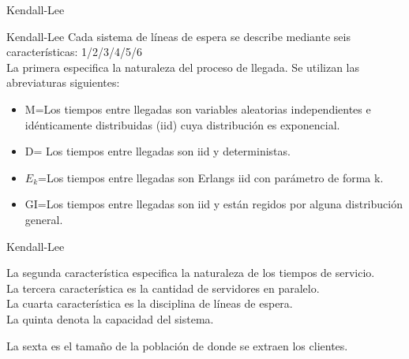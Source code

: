 \begin{frame}
	\centering \LARGE \color{naranjaUCA} Kendall-Lee
\end{frame}
\begin{frame}{Kendall-Lee}
Cada sistema de líneas de espera se describe mediante seis características:
1/2/3/4/5/6
\\
		La primera especifica la naturaleza del proceso de llegada. Se utilizan las abreviaturas siguientes:
		\pause
		\begin{itemize}
			\item M=Los tiempos entre llegadas son variables aleatorias independientes e idénticamente distribuidas (iid) cuya distribución es exponencial.
			\pause
			\item D= Los tiempos entre llegadas son iid y deterministas. \pause
			\item $E_k$=Los tiempos entre llegadas son Erlangs iid con parámetro de forma k.
			\pause
			\item GI=Los tiempos entre llegadas son iid y están regidos por alguna distribución general.
			\pause
		\end{itemize}

\end{frame}

\begin{frame}{Kendall-Lee}
	
	La segunda característica especifica la naturaleza de los tiempos de servicio.
	\pause
	\\
	La tercera característica es la cantidad de servidores en paralelo. 
	\pause
	\\ La cuarta característica es la disciplina de líneas de espera.
	\pause
	\\	La quinta denota la capacidad del sistema.
	\\
	\pause
	
	La sexta es el tamaño de la población de donde se extraen los clientes.
\end{frame}

